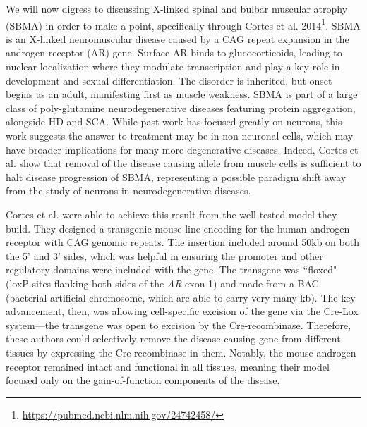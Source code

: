 We will now digress to discussing X-linked spinal and bulbar muscular atrophy (SBMA) in order to make a point, specifically through Cortes et al. 2014\footnote{\url{https://pubmed.ncbi.nlm.nih.gov/24742458/}}. SBMA is an X-linked neuromuscular disease caused by a CAG repeat expansion in the androgen receptor (AR) gene. Surface AR binds to glucocorticoids, leading to nuclear localization where they modulate transcription and play a key role in development and sexual differentiation. The disorder is inherited, but onset begins as an adult, manifesting first as muscle weakness. SBMA is part of a large class of poly-glutamine neurodegenerative diseases featuring protein aggregation, alongside HD and SCA. While past work has focused greatly on neurons, this work suggests the answer to treatment may be in non-neuronal cells, which may have broader implications for many more degenerative diseases. Indeed, Cortes et al. show that removal of the disease causing allele from muscle cells is sufficient to halt disease progression of SBMA, representing a possible paradigm shift away from the study of neurons in neurodegenerative diseases.\newline

Cortes et al. were able to achieve this result from the well-tested model they build. They designed a transgenic mouse line encoding for the human androgen receptor with CAG genomic repeats. The insertion included around 50kb on both the 5' and 3' sides, which was helpful in ensuring the promoter and other regulatory domains were included with the gene. The transgene was ``floxed" (loxP sites flanking both sides of the \textit{AR} exon 1) and made from a BAC (bacterial artificial chromosome, which are able to carry very many kb). The key advancement, then, was allowing cell-specific excision of the gene via the Cre-Lox system---the transgene was open to excision by the Cre-recombinase. Therefore, these authors could selectively remove the disease causing gene from different tissues by expressing the Cre-recombinase in them. Notably, the mouse androgen receptor remained intact and functional in all tissues, meaning their model focused only on the gain-of-function components of the disease.\newline 

